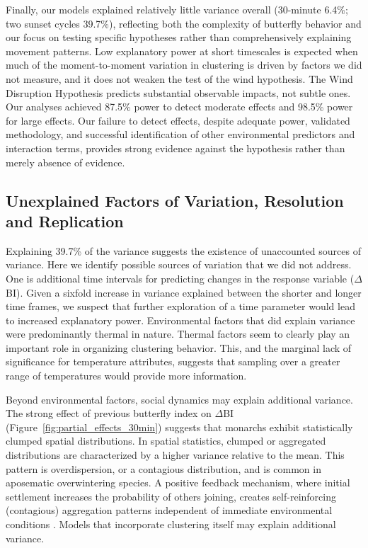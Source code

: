\documentclass[insects,article,submit,pdftex,moreauthors]{Definitions/mdpi}
\begin{document}
Finally, our models explained relatively little variance overall (30-minute 6.4\%; two sunset cycles 39.7\%), reflecting both the complexity of butterfly behavior and our focus on testing specific hypotheses rather than comprehensively explaining movement patterns. Low explanatory power at short timescales is expected when much of the moment-to-moment variation in clustering is driven by factors we did not measure, and it does not weaken the test of the wind hypothesis. The Wind Disruption Hypothesis predicts substantial observable impacts, not subtle ones. Our analyses achieved 87.5\% power to detect moderate effects and 98.5\% power for large effects. Our failure to detect effects, despite adequate power, validated methodology, and successful identification of other environmental predictors and interaction terms, provides strong evidence against the hypothesis rather than merely absence of evidence.

\subsection{Unexplained Factors of Variation, Resolution and Replication}

Explaining 39.7\% of the variance suggests the existence of unaccounted sources of variance. Here we identify possible sources of variation that we did not address. One is additional time intervals for predicting changes in the response variable ($\Delta$BI). Given a sixfold increase in variance explained between the shorter and longer time frames, we suspect that further exploration of a time parameter would lead to increased explanatory power. Environmental factors that did explain variance were predominantly thermal in nature. Thermal factors seem to clearly play an important role in organizing clustering behavior. This, and the marginal lack of significance for temperature attributes, suggests that sampling over a greater range of temperatures would provide more information.

Beyond environmental factors, social dynamics may explain additional variance. The strong effect of previous butterfly index on $\Delta$BI (Figure~\ref{fig:partial_effects_30min}) suggests that monarchs exhibit statistically clumped spatial distributions. In spatial statistics, clumped or aggregated distributions are characterized by a higher variance relative to the mean. This pattern is overdispersion, or a contagious distribution, and is common in aposematic overwintering species. A positive feedback mechanism, where initial settlement increases the probability of others joining, creates self-reinforcing (contagious) aggregation patterns independent of immediate environmental conditions \cite{berdahlEmergentSensingComplex2013}. Models that incorporate clustering itself may explain additional variance.
\end{document}
